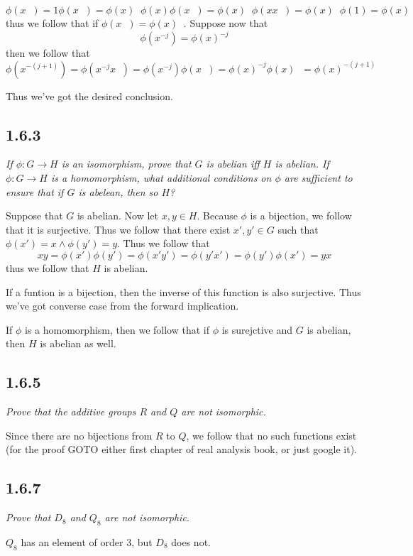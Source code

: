 \documentclass[11pt,oneside,titlepage]{book}
\DeclareMathOperator \inv {^{-1}}
\begin{document}
$$\phi(x\inv) = 1 \phi(x\inv) = \phi(x)\inv \phi(x) \phi(x\inv) = \phi(x)\inv \phi(x x \inv) =
\phi(x)\inv \phi(1) = \phi(x)\inv$$
thus we follow that if $\phi(x\inv) = \phi(x)\inv$. Suppose now that
$$\phi(x^{-j}) = \phi(x)^{-j}$$
then we follow that
$$\phi(x^{-(j + 1)}) = \phi(x^{-j} x\inv) = \phi(x^{-j}) \phi(x\inv) = \phi(x)^{-j} \phi(x)\inv =
\phi(x)^{-(j + 1)}$$

Thus we've got the desired conclusion.

\subsection*{1.6.3}

\textit{If $\phi: G \to H$ is an isomorphism, prove that $G$ is abelian iff $H$ is abelian.
  If $\phi: G \to H$ is a homomorphism, what additional conditions on $\phi$ are sufficient to
  ensure that if $G$ is abelean, then so $H$?}

Suppose that $G$ is abelian. Now let $x, y \in H$. Because $\phi$ is a bijection,
we follow that it is surjective. Thus we follow that there exist $x', y' \in G$
such that $\phi(x') = x \land \phi(y') = y$. Thus we follow that
$$xy = \phi(x') \phi(y') = \phi(x'y') = \phi(y' x') = \phi(y') \phi(x') = yx$$
thus we follow that $H$ is abelian.

If a funtion is a bijection, then the  inverse of this function is also surjective. Thus
we've got converse case from the forward implication.

If $\phi$ is a homomorphism, then we follow that if $\phi$ is surejctive and
$G$ is abelian, then $H$ is abelian as well.

\subsection*{1.6.5}

\textit{Prove that the additive groups $R$ and $Q$ are not isomorphic.}

Since there are no bijections from $R$ to $Q$, we follow that no such functions exist (for
the proof GOTO either first chapter of real analysis book, or just google it).

\subsection*{1.6.7}

\textit{Prove that $D_8$ and $Q_8$ are not isomorphic.}

$Q_8$ has an element of order $3$, but $D_8$ does not.
\end{document}
